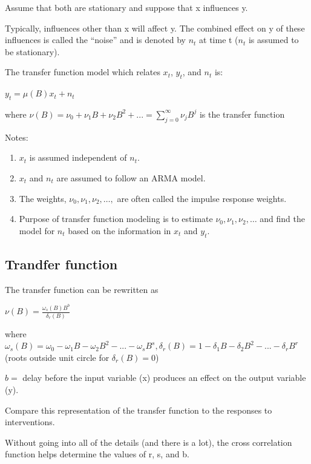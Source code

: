 \documentclass[
]{book}
\providecommand{\tightlist}{%
  \setlength{\itemsep}{0pt}\setlength{\parskip}{0pt}}
\theoremstyle{definition}
\theoremstyle{definition}
\theoremstyle{definition}
\theoremstyle{definition}
\theoremstyle{remark}
\begin{document}
Assume that both are stationary and suppose that x influences y.

Typically, influences other than x will affect y. The combined effect on y of these influences is called the ``noise'' and is denoted by \(n_t\) at time t (\(n_t\) is assumed to be stationary).

The transfer function model which relates \(x_t\), \(y_t\), and \(n_t\) is:

\(y_t=\mu(B)x_t+n_t\)

where \(\nu(B)=\nu_0+\nu_1B+\nu_2B^2+...=\sum_{j=0}^{\infty}\nu_jB^j\) is the transfer function

Notes:

\begin{enumerate}
\def\labelenumi{\arabic{enumi}.}
\tightlist
\item
  \(x_t\) is assumed independent of \(n_t\).
\item
  \(x_t\) and \(n_t\) are assumed to follow an ARMA model.
\item
  The weights, \(\nu_0,\nu_1,\nu_2, …,\) are often called the impulse response weights.\\
\item
  Purpose of transfer function modeling is to estimate \(\nu_0, \nu_1, \nu_2, …\) and find the model for \(n_t\) based on the information in \(x_t\) and \(y_t\).
\end{enumerate}

\hypertarget{trandfer-function}{%
\subsection{Trandfer function}\label{trandfer-function}}

The transfer function can be rewritten as

\(\nu(B)=\frac{\omega_s(B)B^b}{\delta_r(B)}\)

where \(\omega_s(B)=\omega_0-\omega_1B-\omega_2B^2-...-\omega_sB^s, \delta_r(B)=1-\delta_1B-\delta_2B^2-...-\delta_rB^r\)(roots outside unit circle for \(\delta_r(B)=0\))

\(b=\) delay before the input variable (x) produces an effect on the output variable (y).

Compare this representation of the transfer function to the responses to interventions.

Without going into all of the details (and there is a lot), the cross correlation function helps determine the values of r, s, and b.
\end{document}
